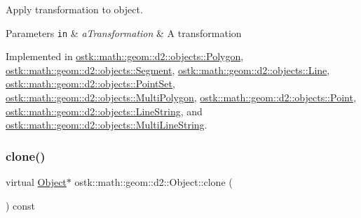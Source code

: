 Apply transformation to object. 


\begin{DoxyParams}[1]{Parameters}
\mbox{\tt in}  & {\em a\+Transformation} & A transformation \\
\hline
\end{DoxyParams}


Implemented in \hyperlink{classostk_1_1math_1_1geom_1_1d2_1_1objects_1_1_polygon_a00d04368f01daa0b234b403321453bbf}{ostk\+::math\+::geom\+::d2\+::objects\+::\+Polygon}, \hyperlink{classostk_1_1math_1_1geom_1_1d2_1_1objects_1_1_segment_afbd5fe1b8136f738a0e93b934b290394}{ostk\+::math\+::geom\+::d2\+::objects\+::\+Segment}, \hyperlink{classostk_1_1math_1_1geom_1_1d2_1_1objects_1_1_line_a75088e717153954f56cdd2df2087bdb6}{ostk\+::math\+::geom\+::d2\+::objects\+::\+Line}, \hyperlink{classostk_1_1math_1_1geom_1_1d2_1_1objects_1_1_point_set_a8c4140ca8434580a95df773d3aeed5bb}{ostk\+::math\+::geom\+::d2\+::objects\+::\+Point\+Set}, \hyperlink{classostk_1_1math_1_1geom_1_1d2_1_1objects_1_1_multi_polygon_a2dfac474c7787aac7ea0822e409bbff5}{ostk\+::math\+::geom\+::d2\+::objects\+::\+Multi\+Polygon}, \hyperlink{classostk_1_1math_1_1geom_1_1d2_1_1objects_1_1_point_aa880df23e5ee93a60dad85597c600fb0}{ostk\+::math\+::geom\+::d2\+::objects\+::\+Point}, \hyperlink{classostk_1_1math_1_1geom_1_1d2_1_1objects_1_1_line_string_afd26337c26696a0ff1b4b2e94e58f17c}{ostk\+::math\+::geom\+::d2\+::objects\+::\+Line\+String}, and \hyperlink{classostk_1_1math_1_1geom_1_1d2_1_1objects_1_1_multi_line_string_ada5fe5a183b6628831867b416901459e}{ostk\+::math\+::geom\+::d2\+::objects\+::\+Multi\+Line\+String}.

\mbox{\label{classostk_1_1math_1_1geom_1_1d2_1_1_object_a98dedc6792aef35308966ca768eb3e14}} 
\subsubsection{\texorpdfstring{clone()}{clone()}}
{\footnotesize\ttfamily virtual \hyperlink{classostk_1_1math_1_1geom_1_1d2_1_1_object}{Object}$\ast$ ostk\+::math\+::geom\+::d2\+::\+Object\+::clone (\begin{DoxyParamCaption}{ }\end{DoxyParamCaption}) const\hspace{0.3cm}{\ttfamily [pure virtual]}}



